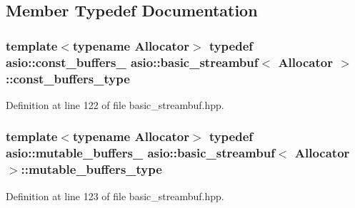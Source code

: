 \subsection{Member Typedef Documentation}
\hypertarget{classasio_1_1basic__streambuf_a6318f8e7cef616d25207918033f02bc9}{}
\subsubsection[{const\+\_\+buffers\+\_\+type}]{\setlength{\rightskip}{0pt plus 5cm}template$<$typename Allocator$>$ typedef {\bf asio\+::const\+\_\+buffers\+\_} {\bf asio\+::basic\+\_\+streambuf}$<$ Allocator $>$\+::{\bf const\+\_\+buffers\+\_\+type}}\label{classasio_1_1basic__streambuf_a6318f8e7cef616d25207918033f02bc9}


Definition at line 122 of file basic\+\_\+streambuf.\+hpp.

\hypertarget{classasio_1_1basic__streambuf_a4d2090a05e1d13270b4e30d848517272}{}
\subsubsection[{mutable\+\_\+buffers\+\_\+type}]{\setlength{\rightskip}{0pt plus 5cm}template$<$typename Allocator$>$ typedef {\bf asio\+::mutable\+\_\+buffers\+\_} {\bf asio\+::basic\+\_\+streambuf}$<$ Allocator $>$\+::{\bf mutable\+\_\+buffers\+\_\+type}}\label{classasio_1_1basic__streambuf_a4d2090a05e1d13270b4e30d848517272}


Definition at line 123 of file basic\+\_\+streambuf.\+hpp.




